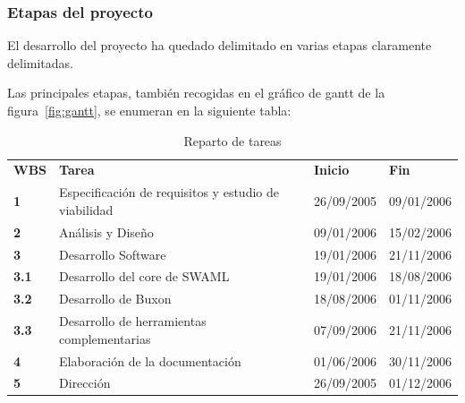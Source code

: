 \subsubsection{Etapas del proyecto}

El desarrollo del proyecto ha quedado delimitado en varias etapas claramente
delimitadas.

Las principales etapas, también recogidas en el gráfico de gantt de la 
figura~\ref{fig:gantt}, se enumeran en la siguiente tabla:


\begin{table}[H]
 \begin{center}
  \begin{tabular}{llll}
	\textbf{WBS} & \textbf{Tarea} & \textbf{Inicio} & \textbf{Fin} \\
	\textbf{1}   & Especificación de requisitos y estudio de viabilidad & 26/09/2005 & 09/01/2006 \\
	\textbf{2}   & Análisis y Diseño & 09/01/2006 & 15/02/2006 \\
	\textbf{3}   & Desarrollo Software & 19/01/2006 & 21/11/2006 \\
	\textbf{3.1} & Desarrollo del core de SWAML & 19/01/2006 & 18/08/2006 \\	
	\textbf{3.2} & Desarrollo de Buxon & 18/08/2006 & 01/11/2006 \\
	\textbf{3.3} & Desarrollo de herramientas complementarias & 07/09/2006 & 21/11/2006 \\	
	\textbf{4}   & Elaboración de la documentación & 01/06/2006 & 30/11/2006 \\	
	\textbf{5}   & Dirección & 26/09/2005 & 01/12/2006
  \end{tabular}
  \caption{Reparto de tareas}
 \end{center}
\end{table}

